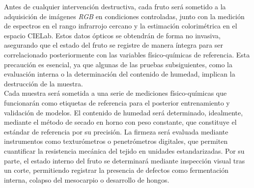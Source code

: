 Antes de cualquier intervención destructiva, cada fruto será sometido a la adquisición de imágenes \textit{RGB} en condiciones controladas, junto con la medición de espectros en el rango infrarrojo cercano y la estimación colorimétrica en el espacio CIELab. Estos datos ópticos se obtendrán de forma no invasiva, asegurando que el estado del fruto se registre de manera íntegra para ser correlacionado posteriormente con las variables físico-químicas de referencia. Esta precaución es esencial, ya que algunas de las pruebas subsiguientes, como la evaluación interna o la determinación del contenido de humedad, implican la destrucción de la muestra.\\

Cada muestra será sometida a una serie de mediciones físico-químicas que funcionarán como etiquetas de referencia para el posterior entrenamiento y validación de modelos. El contenido de humedad será determinado, idealmente, mediante el método de secado en horno con peso constante, que constituye el estándar de referencia por su precisión. La firmeza será evaluada mediante instrumentos como texturómetros o penetrómetros digitales, que permiten cuantificar la resistencia mecánica del tejido en unidades estandarizadas. Por su parte, el estado interno del fruto se determinará mediante inspección visual tras un corte, permitiendo registrar la presencia de defectos como fermentación interna, colapso del mesocarpio o desarrollo de hongos.

